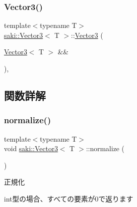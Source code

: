 \mbox{\label{classsaki_1_1_vector3_add1b3e26d1c54b75f1903c6303eb08a6}} 
\subsubsection{\texorpdfstring{Vector3()}{Vector3()}\hspace{0.1cm}{\footnotesize\ttfamily [5/5]}}
{\footnotesize\ttfamily template$<$typename T$>$ \\
\mbox{\hyperlink{classsaki_1_1_vector3}{saki\+::\+Vector3}}$<$ T $>$\+::\mbox{\hyperlink{classsaki_1_1_vector3}{Vector3}} (\begin{DoxyParamCaption}\item[{\mbox{\hyperlink{classsaki_1_1_vector3}{Vector3}}$<$ T $>$ \&\&}]{ }\end{DoxyParamCaption})\hspace{0.3cm}{\ttfamily [default]}, {\ttfamily [noexcept]}}



\subsection{関数詳解}
\mbox{\label{classsaki_1_1_vector3_a7b9496274bab6ea6147e6a09e1493110}} 
\subsubsection{\texorpdfstring{normalize()}{normalize()}}
{\footnotesize\ttfamily template$<$typename T$>$ \\
void \mbox{\hyperlink{classsaki_1_1_vector3}{saki\+::\+Vector3}}$<$ T $>$\+::normalize (\begin{DoxyParamCaption}{ }\end{DoxyParamCaption})\hspace{0.3cm}{\ttfamily [inline]}}



正規化 

int型の場合、すべての要素が0で返ります \mbox{\label{classsaki_1_1_vector3_abcfc63ddcaa8c7f148debedbe7fca788}} 
